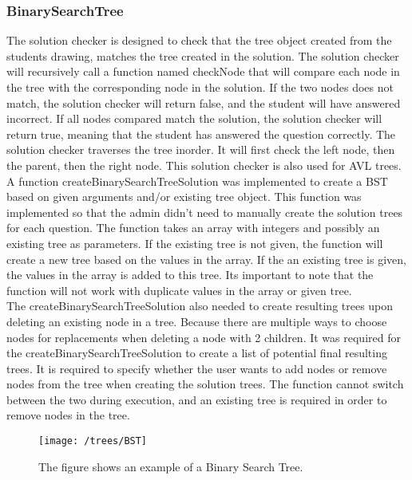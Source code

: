 \subsubsection{BinarySearchTree}
The solution checker is designed to check that the tree object created from the students drawing, matches the tree created in the solution. The solution checker will recursively call a function named checkNode that will compare each node in the tree with the corresponding node in the solution. If the two nodes does not match, the solution checker will return false, and the student will have answered incorrect. If all nodes compared match the solution, the solution checker will return true, meaning that the student has answered the question correctly. The solution checker traverses the tree inorder. It will first check the left node, then the parent, then the right node. This solution checker is also used for AVL trees.\\[11pt]
A function createBinarySearchTreeSolution was implemented to create a BST based on given arguments and/or existing tree object. This function was implemented so that the admin didn't need to manually create the solution trees for each question. The function takes an array with integers and possibly an existing tree as parameters. If the existing tree is not given, the function will create a new tree based on the values in the array. If the an existing tree is given, the values in the array is added to this tree. Its important to note that the function will not work with duplicate values in the array or given tree. \\
The createBinarySearchTreeSolution also needed to create resulting trees upon deleting an existing node in a tree. Because there are multiple ways to choose nodes for replacements when deleting a node with 2 children. It was required for the createBinarySearchTreeSolution to create a list of potential final resulting trees. It is required to specify whether the user wants to add nodes or remove nodes from the tree when creating the solution trees. The function cannot switch between the two during execution, and an existing tree is required in order to remove nodes in the tree.
\begin{figure}[h]
	\centering
	\texttt{[image: /trees/BST]}
	\caption{The figure shows an example of a Binary Search Tree.}	
	\label{fig:BST}
\end{figure}
